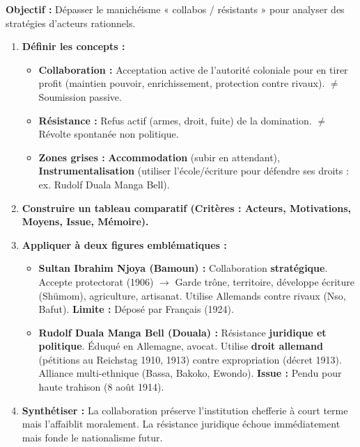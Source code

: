\documentclass[11pt]{article}
\begin{document}
\begin{methode}
\textbf{Objectif :} Dépasser le manichéisme « collabos / résistants » pour analyser des stratégies d'acteurs rationnels.
\begin{enumerate}
    \item \textbf{Définir les concepts :}
    \begin{itemize}
        \item \textbf{Collaboration :} Acceptation active de l'autorité coloniale pour en tirer profit (maintien pouvoir, enrichissement, protection contre rivaux). $\neq$ Soumission passive.
        \item \textbf{Résistance :} Refus actif (armes, droit, fuite) de la domination. $\neq$ Révolte spontanée non politique.
        \item \textbf{Zones grises :} \textbf{Accommodation} (subir en attendant), \textbf{Instrumentalisation} (utiliser l'école/écriture pour défendre ses droits : ex. Rudolf Duala Manga Bell).
    \end{itemize}
    \item \textbf{Construire un tableau comparatif (Critères : Acteurs, Motivations, Moyens, Issue, Mémoire).}
    \item \textbf{Appliquer à deux figures emblématiques :}
    \begin{itemize}
        \item \textbf{Sultan Ibrahim Njoya (Bamoun) :} Collaboration \textbf{stratégique}. Accepte protectorat (1906) $\rightarrow$ Garde trône, territoire, développe écriture (Shümom), agriculture, artisanat. Utilise Allemands contre rivaux (Nso, Bafut). \textbf{Limite :} Déposé par Français (1924).
        \item \textbf{Rudolf Duala Manga Bell (Douala) :} Résistance \textbf{juridique et politique}. Éduqué en Allemagne, avocat. Utilise \textbf{droit allemand} (pétitions au Reichstag 1910, 1913) contre expropriation (décret 1913). Alliance multi-ethnique (Bassa, Bakoko, Ewondo). \textbf{Issue :} Pendu pour haute trahison (8 août 1914).
    \end{itemize}
    \item \textbf{Synthétiser :} La collaboration préserve l'institution chefferie à court terme mais l'affaiblit moralement. La résistance juridique échoue immédiatement mais fonde le nationalisme futur.
\end{enumerate}
\end{methode}
\end{document}
